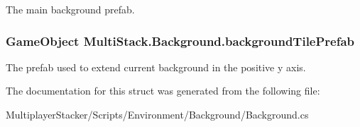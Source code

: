 The main background prefab. 

\hypertarget{struct_multi_stack_1_1_background_a2445bc70876fadb6dbb7d0914c276f21}{}
\subsubsection[{background\+Tile\+Prefab}]{\setlength{\rightskip}{0pt plus 5cm}Game\+Object Multi\+Stack.\+Background.\+background\+Tile\+Prefab}\label{struct_multi_stack_1_1_background_a2445bc70876fadb6dbb7d0914c276f21}


The prefab used to extend current background in the positive y axis. 



The documentation for this struct was generated from the following file\+:\begin{DoxyCompactItemize}
\item 
Multiplayer\+Stacker/\+Scripts/\+Environment/\+Background/Background.\+cs\end{DoxyCompactItemize}
